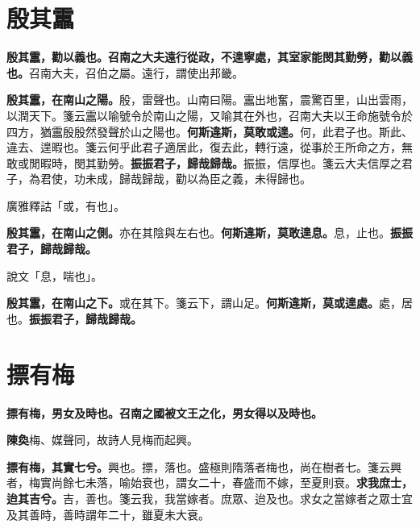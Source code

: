 \section{殷其靁}


\textbf{殷其靁，勸以義也。召南之大夫遠行從政，不遑寧處，其室家能閔其勤勞，勸以義也。}{\footnotesize 召南大夫，召伯之屬。遠行，謂使出邦畿。}

\textbf{殷其靁，在南山之陽。}{\footnotesize 殷，雷聲也。山南曰陽。靁出地奮，震驚百里，山出雲雨，以潤天下。箋云靁以喻號令於南山之陽，又喻其在外也，召南大夫以王命施號令於四方，猶靁殷殷然發聲於山之陽也。}\textbf{何斯違斯，莫敢或遑。}{\footnotesize 何，此君子也。斯此、違去、遑暇也。箋云何乎此君子適居此，復去此，轉行遠，從事於王所命之方，無敢或閒暇時，閔其勤勞。}\textbf{振振君子，歸哉歸哉。}{\footnotesize 振振，信厚也。箋云大夫信厚之君子，為君使，功未成，歸哉歸哉，勸以為臣之義，未得歸也。}

\begin{quoting}廣雅釋詁「或，有也」。\end{quoting}

\textbf{殷其靁，在南山之側。}{\footnotesize 亦在其陰與左右也。}\textbf{何斯違斯，莫敢遑息。}{\footnotesize 息，止也。}\textbf{振振君子，歸哉歸哉。}

\begin{quoting}說文「息，喘也」。\end{quoting}

\textbf{殷其靁，在南山之下。}{\footnotesize 或在其下。箋云下，謂山足。}\textbf{何斯違斯，莫或遑處。}{\footnotesize 處，居也。}\textbf{振振君子，歸哉歸哉。}

\section{摽有梅}


\textbf{摽有梅，男女及時也。召南之國被文王之化，男女得以及時也。}

\begin{quoting}\textbf{陳奐}梅、媒聲同，故詩人見梅而起興。\end{quoting}

\textbf{摽有梅，其實七兮。}{\footnotesize 興也。摽，落也。盛極則隋落者梅也，尚在樹者七。箋云興者，梅實尚餘七未落，喻始衰也，謂女二十，春盛而不嫁，至夏則衰。}\textbf{求我庶士，迨其吉兮。}{\footnotesize 吉，善也。箋云我，我當嫁者。庶眾、迨及也。求女之當嫁者之眾士宜及其善時，善時謂年二十，雖夏未大衰。}

